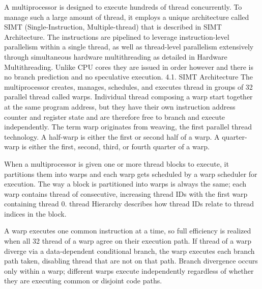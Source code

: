 \documentclass{article}
\begin{document}
A multiprocessor is designed to execute hundreds of thread concurrently. To manage such a large amount of thread, it employs a unique architecture called SIMT (Single-Instruction, Multiple-thread) that is described in SIMT Architecture. The instructions are pipelined to leverage instruction-level parallelism within a single thread, as well as thread-level parallelism extensively through simultaneous hardware multithreading as detailed in Hardware Multithreading. Unlike CPU cores they are issued in order however and there is no branch prediction and no speculative execution.
4.1. SIMT Architecture
The multiprocessor creates, manages, schedules, and executes thread in groups of 32 parallel thread called warps. Individual thread composing a warp start together at the same program address, but they have their own instruction address counter and register state and are therefore free to branch and execute independently. The term warp originates from weaving, the first parallel thread technology. A half-warp is either the first or second half of a warp. A quarter-warp is either the first, second, third, or fourth quarter of a warp.

When a multiprocessor is given one or more thread blocks to execute, it partitions them into warps and each warp gets scheduled by a warp scheduler for execution. The way a block is partitioned into warps is always the same; each warp contains thread of consecutive, increasing thread IDs with the first warp containing thread 0. thread Hierarchy describes how thread IDs relate to thread indices in the block.

A warp executes one common instruction at a time, so full efficiency is realized when all 32 thread of a warp agree on their execution path. If thread of a warp diverge via a data-dependent conditional branch, the warp executes each branch path taken, disabling thread that are not on that path. Branch divergence occurs only within a warp; different warps execute independently regardless of whether they are executing common or disjoint code paths.
\end{document}
